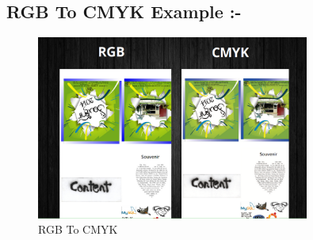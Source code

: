 \subsection{RGB To CMYK Example :-}
\begin{figure}[h!]
\centering
\includegraphics[width=0.8\textwidth]{images/rc.png}
\caption{RGB To CMYK}
\end{figure}
